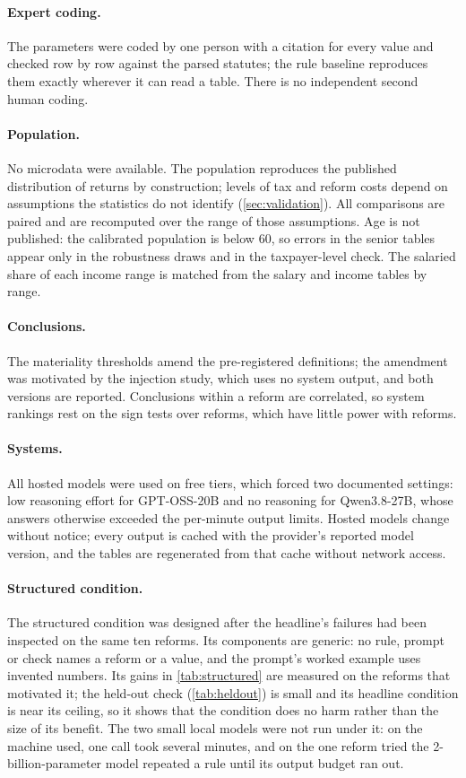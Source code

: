\documentclass[sn-apa]{sn-jnl}
\begin{document}
\paragraph{Expert coding.} The parameters were coded by one person with a
citation for every value and checked row by row against the parsed statutes;
the rule baseline reproduces them exactly wherever it can read a table. There
is no independent second human coding.

\paragraph{Population.} No microdata were available. The population
reproduces the published distribution of returns by construction; levels of
tax and reform costs depend on assumptions the statistics do not identify
(\cref{sec:validation}). All comparisons are paired and are recomputed over
the range of those assumptions. Age is not published: the calibrated
population is below 60, so errors in the senior tables appear only in the
robustness draws and in the taxpayer-level check. The salaried share of each
income range is matched from the salary and income tables by range.

\paragraph{Conclusions.} The materiality thresholds amend the pre-registered
definitions; the amendment was motivated by the injection study, which uses
no system output, and both versions are reported. Conclusions within a
reform are correlated, so system rankings rest on the sign tests over
reforms, which have little power with  reforms.

\paragraph{Systems.} All hosted models were used on free tiers, which forced
two documented settings: low reasoning effort for GPT-OSS-20B and no
reasoning for Qwen3.8-27B, whose answers otherwise exceeded the per-minute
output limits. Hosted models change without notice; every output is cached
with the provider's reported model version, and the tables are regenerated
from that cache without network access.

\paragraph{Structured condition.} The structured condition was designed
after the headline's failures had been inspected on the same ten reforms.
Its components are generic: no rule, prompt or check names a reform or a
value, and the prompt's worked example uses invented numbers. Its gains in
\cref{tab:structured} are measured on the reforms that motivated it; the
held-out check (\cref{tab:heldout}) is small and its headline condition is
near its ceiling, so it shows that the condition does no harm rather than
the size of its benefit. The two small local
models were not run under it: on the machine used, one call took several
minutes, and on the one reform tried the 2-billion-parameter model repeated
a rule until its output budget ran out.
\end{document}
